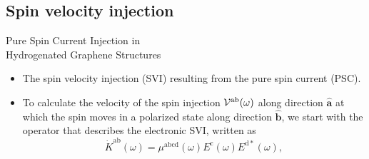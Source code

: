 \documentclass{beamer}
\begin{document}
\subsection{Spin velocity injection}


\begin{frame}

\vspace{-0.7cm}

\noindent\makebox[\linewidth]{\rule{\linewidth}{0.4pt}}

\vspace{-2.0mm}
\begin{center}
{\large Pure Spin Current Injection in \\Hydrogenated Graphene Structures}
\end{center}

\vspace{-6mm}
\noindent\makebox[\linewidth]{\rule{\linewidth}{0.4pt}}

\vspace{2mm}

{\small

\begin{itemize}

\item 
The spin velocity injection (SVI) resulting from the pure spin current (PSC).

\item 
To calculate the velocity of the spin injection ${\cal
V}^{\mathrm{a}\mathrm{b}}(\omega)$ along direction $\hat{\mathbf{a}}$ at which
the spin moves in a polarized state along direction $\hat{\mathbf{b}}$, we
start with the operator that describes the electronic SVI, written as
\begin{equation}
\dot{K}^{\mathrm{ab}}(\omega) =
\mu^{\mathrm{abcd}}(\omega)
E^{\mathrm{c}}(\omega) E^{\mathrm{d*}}(\omega),
\label{eq:dotk}
\end{equation}

\end{itemize}
}
\end{frame}

\end{document}

